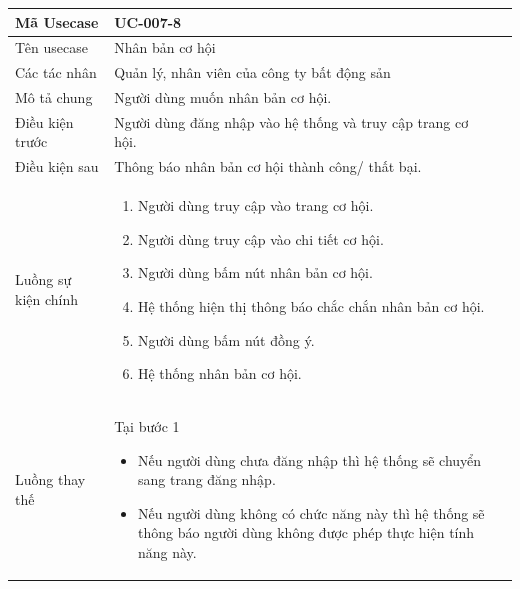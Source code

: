 \documentclass[12pt,a4paper]{article}
\begin{document}
    \begin{table}[H]
        \centering
        \begin{tabular}{|p{3.5cm}|p{11.5cm}|c|}
            \hline
            Mã Usecase      & UC-007-8                                                    \\
            \hline
            Tên usecase     & Nhân bản cơ hội                                             \\
            \hline
            Các tác nhân    & Quản lý, nhân viên của công ty bất động sản                 \\
            \hline
            Mô tả chung     & Người dùng muốn nhân bản cơ hội.                            \\
            \hline

            Điều kiện trước & Người dùng đăng nhập vào hệ thống và truy cập trang cơ hội. \\
            \hline

            Điều kiện sau   & Thông báo nhân bản cơ hội thành công/ thất bại.             \\
            \hline

            Luồng sự kiện chính & \vspace{-.8cm}\begin{enumerate}
                                                    \item Người dùng truy cập vào trang cơ hội.
                                                    \item Người dùng truy cập vào chi tiết cơ hội.
                                                    \item  Người dùng bấm nút nhân bản cơ hội.
                                                    \item  Hệ thống hiện thị thông báo chắc chắn nhân bản cơ hội.
                                                    \item  Người dùng bấm nút đồng ý.
                                                    \item Hệ thống nhân bản cơ hội.
            \end{enumerate}
            \\
            \hline
            Luồng thay thế & Tại bước 1\newline
            \vspace{-.8cm}\begin{itemize}
                              \item Nếu người dùng chưa đăng nhập thì hệ thống sẽ chuyển sang trang đăng nhập.
                              \item Nếu người dùng không có chức năng này thì hệ thống sẽ thông báo người dùng không được phép thực hiện tính năng này.
            \end{itemize}


\end{tabular}
\end{table}
\end{document}
